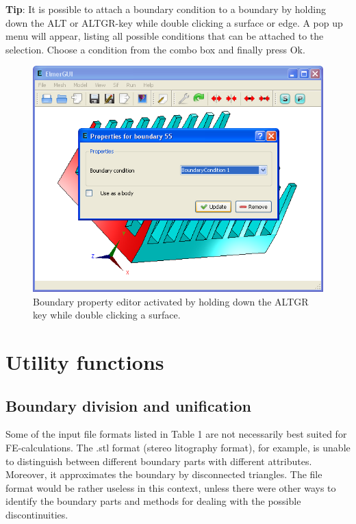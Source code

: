 \documentclass[a4paper,12pt]{article}
\begin{document}
{\bf Tip}: It is possible to attach a boundary condition to a boundary by holding down 
the ALT or ALTGR-key while double clicking a surface or edge. A pop up menu will appear, listing all possible conditions that can be attached to the selection. 
Choose a condition from the combo box and finally press Ok.

\begin{figure}[ht]
\begin{center}
 \includegraphics[scale=0.5]{images/boundaryproperties.png}
\caption{Boundary property editor activated by holding down the ALTGR key while double
clicking a surface.}
\end{center}
\end{figure}

\section{Utility functions}

\subsection{Boundary division and unification}

Some of the input file formats listed in Table 1 are not necessarily best suited for
FE-calculations. The .stl format (stereo litography format), for example, is unable
to distinguish between different boundary parts with different attributes. Moreover, it
approximates the boundary by disconnected triangles. The file format would
be rather useless in this context, unless there were other ways to identify the
boundary parts and methods for dealing with the possible discontinuities.
\end{document}
